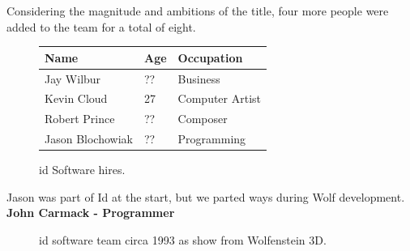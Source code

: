 \documentclass[book.tex]{subfiles}
\begin{document}
Considering the magnitude and ambitions of the title, four more people were added to the team for a total of eight.\\

 \begin{figure}[H]
\centering  
\begin{tabularx}{\textwidth}{ X  X  X  }
  \toprule
  \textbf{Name} &  \textbf{Age} & \textbf{Occupation} \\
  \toprule 
   Jay Wilbur & ?? &  Business\\
   Kevin Cloud & 27 &  Computer Artist\\
   Robert Prince & ?? &  Composer\\
   Jason Blochowiak & ?? &   Programming\\
     \toprule
\end{tabularx}
\caption{id Software hires.}\label{fig:Id Software hires}
\end{figure}
\begin{fancyquotes}
Jason was part of Id at the start, but we parted ways during Wolf development.
 \bigskip \\
\textbf{John Carmack - Programmer}
 \end{fancyquotes}
 
\begin{figure}[H]
\centering
\caption{id software team circa 1993 as show from Wolfenstein 3D.}
\label{fig:id_team_1993}
\end{figure}
 
\end{document}
